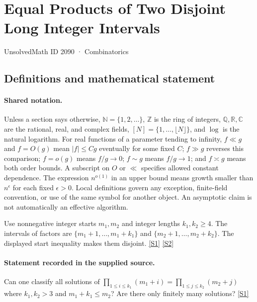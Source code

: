 \documentclass[11pt,a4paper]{article}
\newcommand{\N}{\mathbb{N}}
\newcommand{\Z}{\mathbb{Z}}
\newcommand{\Q}{\mathbb{Q}}
\newcommand{\R}{\mathbb{R}}
\newcommand{\C}{\mathbb{C}}
\newcommand{\sref}[2]{\hyperlink{source:#1:#2}{[S#2]}}
\begin{document}

\setcounter{section}{2089}

\section{Equal Products of Two Disjoint Long Integer Intervals}\label{2090}

{\small\sffamily UnsolvedMath ID 2090 · Combinatorics}

\subsection{Definitions and mathematical statement}

\paragraph{Shared notation.}Unless a section says otherwise, $\N=\{1,2,\ldots\}$,
$\Z$ is the ring of integers, $\Q,\R,\C$ are the rational, real, and complex
fields, $[N]=\{1,\ldots,\lfloor N\rfloor\}$, and $\log$ is the natural
logarithm. For real functions of a parameter tending to infinity,
$f\ll g$ and $f=O(g)$ mean $|f|\leq Cg$ eventually for some fixed $C$;
$f\gg g$ reverses this comparison; $f=o(g)$ means $f/g\to0$;
$f\sim g$ means $f/g\to1$; and $f\asymp g$ means both order bounds.
A subscript on $O$ or $\ll$ specifies allowed constant dependence.
The expression $n^{o(1)}$ in an upper bound means growth smaller than
$n^\epsilon$ for each fixed $\epsilon>0$. Local definitions govern any
exception, finite-field convention, or use of the same symbol for another
object. An asymptotic claim is not automatically an effective algorithm.



Use nonnegative integer starts $m_1,m_2$ and integer lengths $k_1,k_2\geq4$. The intervals of factors are $\{m_1+1,\ldots,m_1+k_1\}$ and $\{m_2+1,\ldots,m_2+k_2\}$. The displayed start inequality makes them disjoint. \sref{2090}{1} \sref{2090}{2}

\paragraph{Statement recorded in the supplied source.}
Can one classify all solutions of $ \prod_{1\leq i\leq k_1}(m_1+i)=\prod_{1\leq j\leq k_2}(m_2+j) $ where $k_1,k_2>3$ and $m_1+k_1\leq m_2$? Are there only finitely many solutions? \sref{2090}{1}
\end{document}
